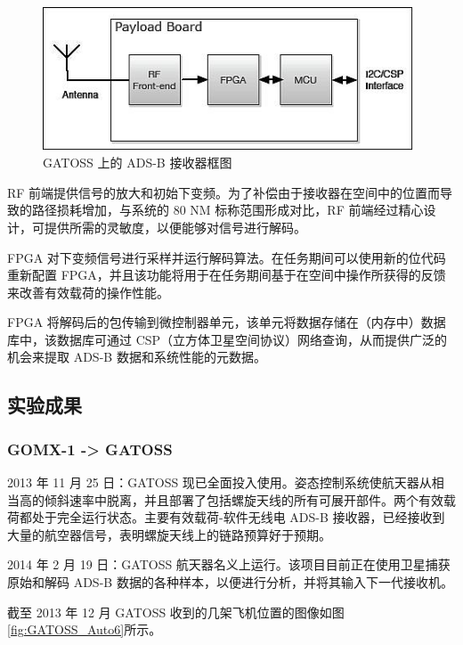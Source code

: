 \begin{figure}[!htb]
\centering
\includegraphics[width=11cm]{pic/GATOSS_Auto4.jpeg}
\caption{GATOSS 上的 ADS-B 接收器框图\protect\footnotemark}
\label{fig:GATOSS_Auto4}
\end{figure}


RF 前端提供信号的放大和初始下变频。为了补偿由于接收器在空间中的位置而导致的路径损耗增加，与系统的 80 NM 标称范围形成对比，RF 前端经过精心设计，可提供所需的灵敏度，以便能够对信号进行解码。

FPGA 对下变频信号进行采样并运行解码算法。在任务期间可以使用新的位代码重新配置 FPGA，并且该功能将用于在任务期间基于在空间中操作所获得的反馈来改善有效载荷的操作性能。

FPGA 将解码后的包传输到微控制器单元，该单元将数据存储在（内存中）数据库中，该数据库可通过 CSP（立方体卫星空间协议）网络查询，从而提供广泛的机会来提取 ADS-B 数据和系统性能的元数据。

\subsection{实验成果}

\subsubsection{GOMX-1 -> GATOSS}

2013 年 11 月 25 日：GATOSS 现已全面投入使用。姿态控制系统使航天器从相当高的倾斜速率中脱离，并且部署了包括螺旋天线的所有可展开部件。两个有效载荷都处于完全运行状态。主要有效载荷-软件无线电 ADS-B 接收器，已经接收到大量的航空器信号，表明螺旋天线上的链路预算好于预期。

2014 年 2 月 19 日：GATOSS 航天器名义上运行。该项目目前正在使用卫星捕获原始和解码 ADS-B 数据的各种样本，以便进行分析，并将其输入下一代接收机。

截至 2013 年 12 月 GATOSS 收到的几架飞机位置的图像如图\ref{fig:GATOSS_Auto6}所示。

